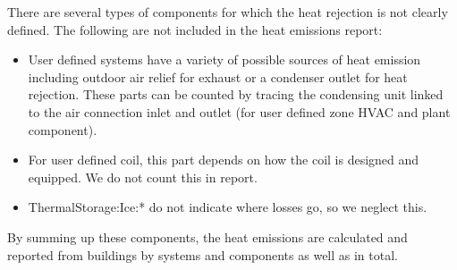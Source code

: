 There are several types of components for which the heat rejection is not clearly defined. The following are not included in the heat emissions report:

\begin{itemize}
  \item User defined systems have a variety of possible sources of heat emission including outdoor air relief for exhaust or a condenser outlet for heat rejection. These parts can be counted by tracing the condensing unit linked to the air connection inlet and outlet (for user defined zone HVAC and plant component).
  \item For user defined coil, this part depends on how the coil is designed and equipped. We do not count this in report.
  \item ThermalStorage:Ice:* do not indicate where losses go, so we neglect this.
\end{itemize}

By summing up these components, the heat emissions are calculated and reported from buildings by systems and components as well as in total.
